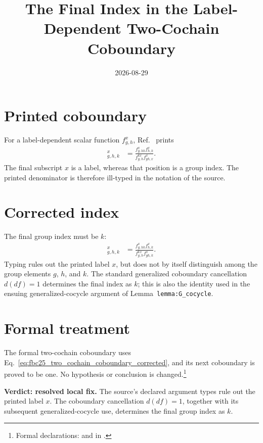 \documentclass{article}
\title{The Final Index in the Label-Dependent Two-Cochain Coboundary}
\author{}
\date{2026-08-29}
\begin{document}
\maketitle
{}

\section{Printed coboundary}

For a label-dependent scalar function $f^x_{g,h}$,
Ref.~\cite[lines~5918--5921]{FrancoRubio2025MPUGauging} prints
\begin{align}
    [df]^x_{g,h,k}
        &=\frac{f^x_{g,hk}f^x_{h,k}}
        {f^{kx}_{g,h}f^x_{gh,x}}.
    \label{eq:fbc25_two_cochain_coboundary_printed}
\end{align}
The final subscript $x$ is a label, whereas that position is a group
index. The printed denominator is therefore ill-typed in the notation of the
source.

\section{Corrected index}

The final group index must be $k$:
\begin{align}
    [df]^x_{g,h,k}
        &=\frac{f^x_{g,hk}f^x_{h,k}}
        {f^{kx}_{g,h}f^x_{gh,k}}.
    \label{eq:fbc25_two_cochain_coboundary_corrected}
\end{align}
Typing rules out the printed label $x$, but does not by itself
distinguish among the group elements $g$, $h$, and $k$.  The standard
generalized coboundary cancellation $d(df)=1$ determines the final index as
$k$; this is also the identity used in the ensuing generalized-cocycle
argument of Lemma~\texttt{lemma:G\_cocycle}.

\section{Formal treatment}

The formal two-cochain coboundary uses
Eq.~\ref{eq:fbc25_two_cochain_coboundary_corrected}, and its next coboundary
is proved to be one. No hypothesis or conclusion is changed.\footnote{Formal
declarations:  and
 in
.}

\textbf{Verdict: resolved local fix.}
The source's declared argument types rule out the printed label $x$.
The coboundary cancellation $d(df)=1$, together with its subsequent
generalized-cocycle use, determines the final group index as $k$.



\end{document}
